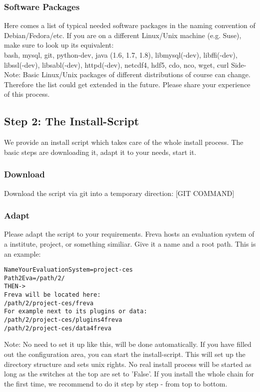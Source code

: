 \documentclass[a4paper,11pt]{ltxdoc}
\begin{document}
\subsubsection{Software Packages}
Here comes a list of typical needed software packages in the naming convention of Debian/Fedora/etc. If you are on a different Linux/Unix machine (e.g. Suse), make sure to look up its equivalent: \\
bash, mysql, git, python-dev, java (1.6, 1.7, 1.8), libmysql(-dev), libffi(-dev), libssl(-dev), libsabl(-dev), httpd(-dev), netcdf4, hdf5, cdo, nco, wget, curl
Side-Note: Basic Linux/Unix packages of different distributions of course can change. Therefore the list could get extended in the future. Please share your experience of this process. 
\subsection{Step 2: The Install-Script}
We provide an install script which takes care of the whole install process. The basic steps are downloading it, adapt it to your needs, start it.
\subsubsection{Download}
Download the script via git into a temporary direction:
[GIT COMMAND]
\subsubsection{Adapt}
Please adapt the script to your requirements. Freva hosts an evaluation system of a institute, project, or something similiar. Give it a name and a root path. This is an example:
\begin{verbatim}
NameYourEvaluationSystem=project-ces
Path2Eva=/path/2/
THEN->
Freva will be located here:
/path/2/project-ces/freva
For example next to its plugins or data:
/path/2/project-ces/plugins4freva
/path/2/project-ces/data4freva
\end{verbatim}

Note: No need to set it up like this, will be done automatically.
If you have filled out the configuration area, you can start the install-script. This will set up the directory structure and sets unix rights. No real install process will be started as long as the switches at the top are set to 'False'. If you install the whole chain for the first time, we recommend to do it step by step - from top to bottom. 
\end{document}
